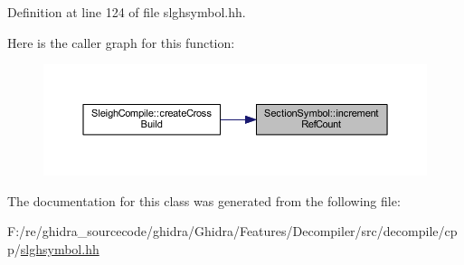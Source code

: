 Definition at line 124 of file slghsymbol.\+hh.

Here is the caller graph for this function\+:
\nopagebreak
\begin{figure}[H]
\begin{center}
\leavevmode
\includegraphics[width=350pt]{class_section_symbol_a5ea9f041ee89fea2d9d99fa80d10e914_icgraph}
\end{center}
\end{figure}


The documentation for this class was generated from the following file\+:\begin{DoxyCompactItemize}
\item 
F\+:/re/ghidra\+\_\+sourcecode/ghidra/\+Ghidra/\+Features/\+Decompiler/src/decompile/cpp/\mbox{\hyperlink{slghsymbol_8hh}{slghsymbol.\+hh}}\end{DoxyCompactItemize}
